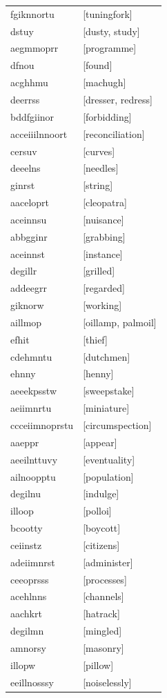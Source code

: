 \documentclass{article}
\begin{document}
\begin{tabular}{ll}
fgiknnortu & [tuningfork] \\
dstuy & [dusty, study] \\
aegmmoprr & [programme] \\
dfnou & [found] \\
acghhmu & [machugh] \\
deerrss & [dresser, redress] \\
bddfgiinor & [forbidding] \\
acceiiilnnoort & [reconciliation] \\
cersuv & [curves] \\
deeelns & [needles] \\
ginrst & [string] \\
aaceloprt & [cleopatra] \\
aceinnsu & [nuisance] \\
abbgginr & [grabbing] \\
aceinnst & [instance] \\
degillr & [grilled] \\
addeegrr & [regarded] \\
giknorw & [working] \\
aillmop & [oillamp, palmoil] \\
efhit & [thief] \\
cdehmntu & [dutchmen] \\
ehnny & [henny] \\
aeeekpsstw & [sweepstake] \\
aeiimnrtu & [miniature] \\
ccceiimnoprstu & [circumspection] \\
aaeppr & [appear] \\
aeeilnttuvy & [eventuality] \\
ailnoopptu & [population] \\
degilnu & [indulge] \\
illoop & [polloi] \\
bcootty & [boycott] \\
ceiinstz & [citizens] \\
adeiimnrst & [administer] \\
ceeoprsss & [processes] \\
acehlnns & [channels] \\
aachkrt & [hatrack] \\
degilmn & [mingled] \\
amnorsy & [masonry] \\
illopw & [pillow] \\
eeillnosssy & [noiselessly] \\

\end{tabular}
\end{document}
